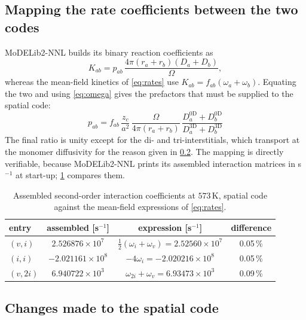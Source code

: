\documentclass{article}
\newcommand{\MoD}{\textsf{MoDELib2-NNL}}
\begin{document}
\subsection{Mapping the rate coefficients between the two codes}
\label{sec:mapping}

\MoD{} builds its binary reaction coefficients as
\begin{equation}
K_{ab} = p_{ab}\,\frac{4\pi (r_a + r_b)(D_a + D_b)}{\Omega},
\label{eq:K3d}
\end{equation}
whereas the mean-field kinetics of \cref{eq:rates} use
$K_{ab}=f_{ab}(\omega_a+\omega_b)$. Equating the two and using \cref{eq:omega}
gives the prefactors that must be supplied to the spatial code:
\begin{equation}
\boxed{\;
p_{ab} = f_{ab}\,\frac{z_c}{a^2}\,\frac{\Omega}{4\pi (r_a+r_b)}\,
\frac{D^{\text{0D}}_a + D^{\text{0D}}_b}{D^{\text{3D}}_a + D^{\text{3D}}_b}\;}
\label{eq:prefactor}
\end{equation}
The final ratio is unity except for the di- and tri-interstitials, which
transport at the monomer diffusivity for the reason given in
\cref{sec:changes}. The mapping is directly verifiable, because \MoD{} prints
its assembled interaction matrices in s$^{-1}$ at start-up;
\cref{tab:reactions} compares them.

\begin{table}[htbp]
\centering
\caption{Assembled second-order interaction coefficients at $573\,$K, spatial
code against the mean-field expressions of \cref{eq:rates}.}
\label{tab:reactions}
\begin{tabular}{@{}lccc@{}}
\toprule
entry & assembled [s$^{-1}$] & expression [s$^{-1}$] & difference \\
\midrule
$(v,i)$   & $2.526876\times 10^{7}$  & $\tfrac12(\omega_i+\omega_v) = 2.52560\times 10^{7}$ & 0.05\,\% \\
$(i,i)$   & $-2.021161\times 10^{8}$ & $-4\omega_i = -2.020216\times 10^{8}$                & 0.05\,\% \\
$(v,2i)$  & $6.940722\times 10^{3}$  & $\omega_{2i}+\omega_v = 6.93473\times 10^{3}$        & 0.09\,\% \\
\bottomrule
\end{tabular}
\end{table}

\subsection{Changes made to the spatial code}
\label{sec:changes}
\end{document}
